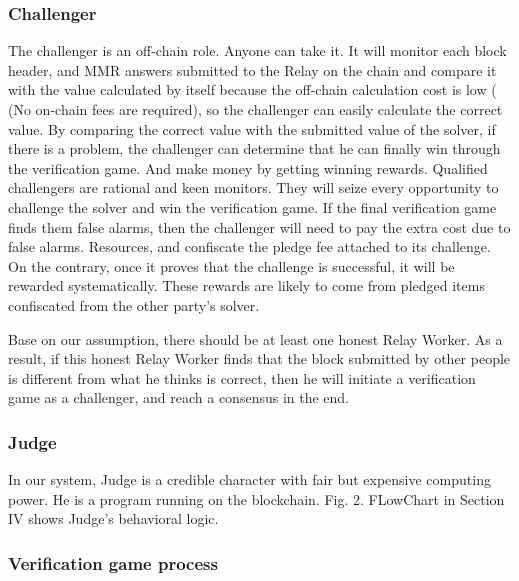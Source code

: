 \subsubsection*{Challenger} 

The challenger is an off-chain role. Anyone can take it. It will monitor each block header, and MMR answers submitted to the Relay on the chain and compare it with the value calculated by itself because the off-chain calculation cost is low ( (No on-chain fees are required), so the challenger can easily calculate the correct value. By comparing the correct value with the submitted value of the solver, if there is a problem, the challenger can determine that he can finally win through the verification game. And make money by getting winning rewards. Qualified challengers are rational and keen monitors. They will seize every opportunity to challenge the solver and win the verification game. If the final verification game finds them false alarms, then the challenger will need to pay the extra cost due to false alarms. Resources, and confiscate the pledge fee attached to its challenge. On the contrary, once it proves that the challenge is successful, it will be rewarded systematically. These rewards are likely to come from pledged items confiscated from the other party's solver.

Base on our assumption, there should be at least one honest Relay Worker. As a result, if this honest Relay Worker finds that the block submitted by other people is different from what he thinks is correct, then he will initiate a verification game as a challenger, and reach a consensus in the end.


\subsubsection*{Judge} 

In our system, Judge is a credible character with fair but expensive computing power. He is a program running on the blockchain. Fig. 2. FLowChart in Section IV shows Judge's behavioral logic.



\subsubsection*{Verification game process} 

